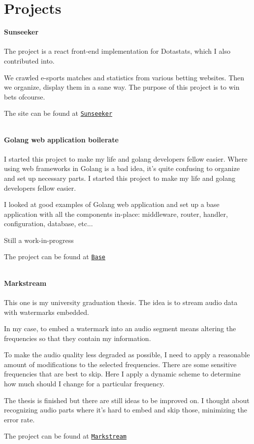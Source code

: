 \documentclass[letterpaper]{article}
\renewenvironment{itemize}{
  \begin{list}{}{
    \setlength{\leftmargin}{1.5em}
  }
}{
  \end{list}
}
\begin{document}
\section*{Projects}
\begin{itemize}
\item{\bf Sunseeker}
\\
\\
The project is a react front-end implementation for Dotastats, which I also contributed into.

We crawled e-sports matches and statistics from various betting websites. Then we organize, display them in a sane way. The purpose of this project is to win bets ofcourse.

The site can be found at \href{https://github.com/v36372/sunseeker}{\tt Sunseeker}
\\
\\
\item{\bf Golang web application boilerate}
\\
\\
I started this project to make my life and golang developers fellow easier. Where using web frameworks in Golang is a bad idea, it's quite confusing to organize and set up necessary parts. I started this project to make my life and golang developers fellow easier.

I looked at good examples of Golang web application and set up a base application with all the components in-place: middleware, router, handler, configuration, database, etc...

Still a work-in-progress

The project can be found at \href{https://github.com/v36372/base}{\tt Base}
\\
\\
\item{\bf Markstream}
\\
\\
This one is my university graduation thesis. The idea is to stream audio data with watermarks embedded.

In my case, to embed a watermark into an audio segment means altering the frequencies so that they contain my information.

To make the audio quality less degraded as possible, I need to apply a reasonable amount of modifications to the selected frequencies. There are some sensitive frequencies that are best to skip. Here I apply a dynamic scheme to determine how much should I change for a particular frequency.

The thesis is finished but there are still ideas to be improved on. I thought about recognizing audio parts where it's hard to embed and skip those, minimizing the error rate.

The project can be found at \href{https://github.com/v36372/markstream}{\tt Markstream}
\end{itemize}
\end{document}
